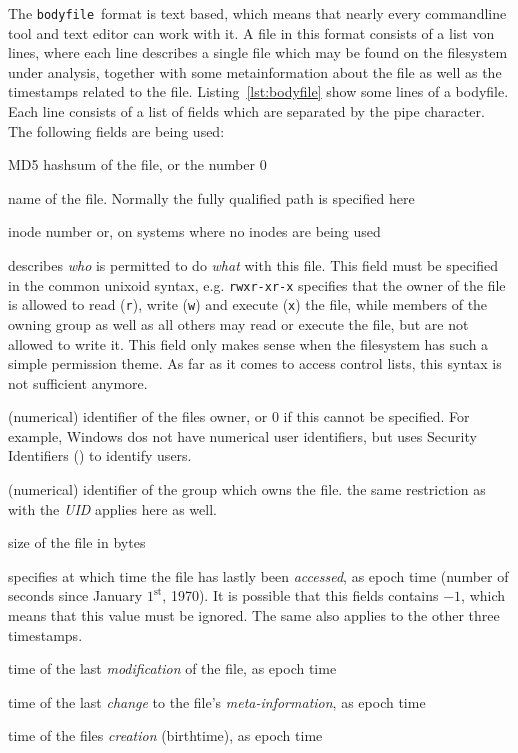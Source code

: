 \documentclass[twocolumn]{article}
\newcommand{\bodyfile}{\texttt{bodyfile}}
\begin{document}
The \bodyfile\ format is text based, which means that nearly every commandline tool and text editor can work with it. A file in this format consists of a list von lines, where each line describes a single file which may be found on the filesystem under analysis, together with some metainformation about the file as well as the timestamps related to the file. Listing~\ref{lst:bodyfile} show some lines of a bodyfile. Each line consists of a list of fields which are separated by the pipe character. The following fields are being used:

\begin{description}[font=\ttfamily]
\item[MD5] MD5 hashsum of the file, or the number $0$
\item[name] name of the file. Normally the fully qualified path is specified here
\item[inode] inode number or, on systems where no inodes are being used
\item[mode] describes \emph{who} is permitted to do \emph{what} with this file. This field must be specified in the common unixoid syntax, e.g. \texttt{rwxr-xr-x} specifies that the owner of the file is allowed to read (\texttt{r}), write (\texttt{w}) and execute (\texttt{x}) the file, while members of the owning group as well as all others may read or execute the file, but are not allowed to write it. This field only makes sense when the filesystem has such a simple permission theme. As far as it comes to access control lists, this syntax is not sufficient anymore.
\item[UID] (numerical) identifier of the files owner, or $0$ if this cannot be specified. For example, Windows dos not have numerical user identifiers, but uses Security Identifiers (\cite{SecurityIdentifiers}) to identify users.
\item[GID] (numerical) identifier of the group which owns the file. the same restriction as with the \emph{UID} applies here as well.
\item[size] size of the file in bytes
\item[atime] specifies at which time the file has lastly been \emph{accessed}, as epoch time (number of seconds since January $1^\text{st}$, 1970). It is possible that this fields contains $-1$, which means that this value must be ignored. The same also applies to the other three timestamps.
\item[mtime] time of the last \emph{modification} of the file, as epoch time
\item[ctime] time of the last \emph{change} to the file's \emph{meta-information}, as epoch time
\item[crtime] time of the files \emph{creation} (birthtime), as epoch time
\end{description}
\end{document}
